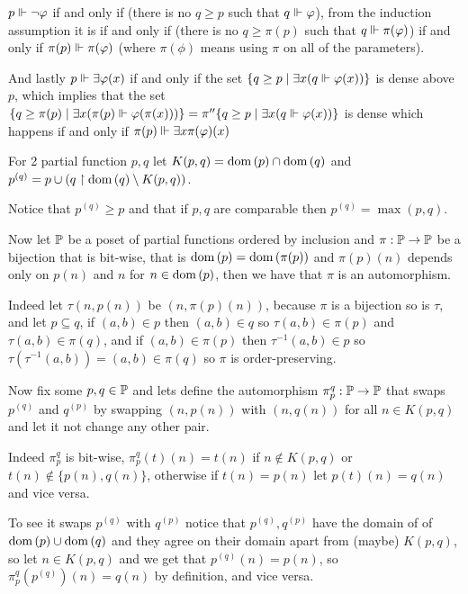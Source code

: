 \begin{cExercise}
\begin{cPart}
		$p\force \lnot\phi$ if and only if (there is no $q\ge p$ such that $q\force \phi$), from the induction assumption it is if and only if (there is no $q\ge \pi(p)$ such that $q\force\pi(\phi)$) if and only if $\pi(p)\force\pi(\phi)$ (where $\pi(\phi)$ means using $\pi$ on all of the parameters).
		
		And lastly $p\force \exists \phi(x)$ if and only if the set $\{q\ge p\mid \exists x(q\force \phi(x))\}$ is dense above $p$, which implies that the set $\{q\ge \pi(p)\mid \exists x(\pi(p)\force \phi(\pi(x)))\}=\pi''\{q\ge p\mid \exists x(q\force \phi(x))\}$ is dense which happens if and only if $\pi(p)\force\exists x\pi(\phi)(x)$
	\end{cPart}
\end{cExercise}
\begin{cExercise}
	\begin{cPart}
		For 2 partial function $p,q$ let $K(p,q)=\dom{p}\cap \dom{q}$ and $p^{(q)}=p\cup (q\restriction \dom{q}\setminus K(p,q))$.
		
		Notice that $p^{(q)}\ge p$ and that if $p,q$ are comparable then $p^{(q)}=\max(p,q)$.
		
		Now let $\P$ be a poset of partial functions ordered by inclusion and $\pi:\P\to\P$ be a bijection that is bit-wise, that is $\dom{p}=\dom{\pi(p)}$ and $\pi(p)(n)$ depends only on $p(n)$ and $n$ for $n\in\dom{p}$, then we have that $\pi$ is an automorphism.
		
		Indeed let $\tau(n,p(n))$ be $(n,\pi(p)(n))$, because $\pi$ is a bijection so is $\tau$, and let $p\subseteq q$, if $(a,b)\in p$ then $(a,b)\in q$ so $\tau(a,b)\in \pi(p)$ and $\tau(a,b)\in \pi(q)$, and if $(a,b)\in \pi(p)$ then $\tau^{-1}(a,b)\in p$ so $\tau(\tau^{-1}(a,b))=(a,b)\in \pi(q)$ so $\pi$ is order-preserving.
		
		Now fix some $p,q\in\P$ and lets define the automorphism $\pi_p^q:\P\to\P$ that swaps $p^{(q)}$ and $q^{(p)}$ by swapping $(n,p(n))$ with $(n,q(n))$ for all $n\in K(p,q)$ and let it not change any other pair.
		
		Indeed $\pi_p^q$ is bit-wise, $\pi_p^q(t)(n)=t(n)$ if $n\notin K(p,q)$ or $t(n)\notin\{p(n),q(n)\}$, otherwise if $t(n)=p(n)$ let $p(t)(n)=q(n)$ and vice versa.
		
		To see it swaps $p^{(q)}$ with $q^{(p)}$ notice that $p^{(q)},q^{(p)}$ have the domain of of $\dom{p}\cup\dom{q}$ and they agree on their domain apart from (maybe) $K(p,q)$, so let $n\in K(p,q)$ and we get that $p^{(q)}(n)=p(n)$, so $\pi_p^q(p^{(q)})(n)=q(n)$ by definition, and vice versa.
		

\end{cPart}
\end{cExercise}
